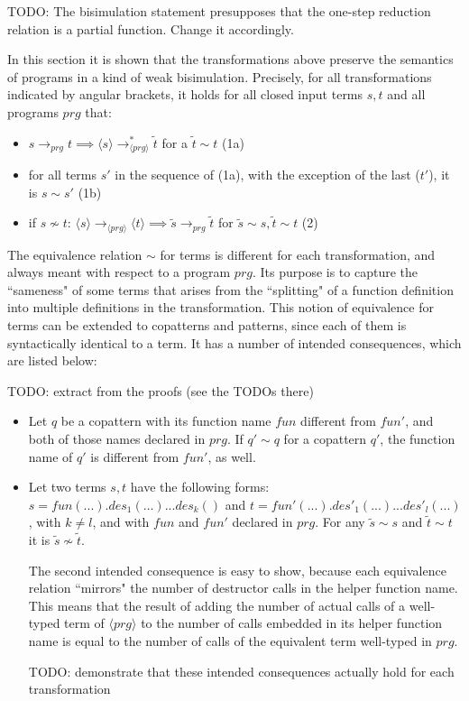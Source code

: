 \documentclass[11pt]{article} %
\begin{document}
TODO: The bisimulation statement presupposes that the one-step reduction relation is a partial function. Change it accordingly.

In this section it is shown that the transformations above preserve the semantics of programs in a kind of weak bisimulation. Precisely, for all transformations indicated by angular brackets, it holds for all closed input terms $s, t$ and all programs $prg$ that:

\begin{itemize}
\item $s \longrightarrow_{prg} t \implies \langle s \rangle  \longrightarrow^*_{\langle prg \rangle} \tilde{t}$ for a $\tilde{t} \sim t$ (1a)

\item for all terms $s'$ in the sequence of (1a), with the exception of the last ($t'$), it is $s \sim s'$ (1b)

\item if $s \not\sim t$: $\langle s \rangle \longrightarrow_{\langle prg \rangle} \langle t \rangle \implies \tilde{s} \longrightarrow_{prg} \tilde{t}$ for $\tilde{s} \sim s, \tilde{t} \sim t$ (2)

\end{itemize}

The equivalence relation $\sim$ for terms is different for each transformation, and always meant with respect to a program $prg$. Its purpose is to capture the ``sameness" of some terms that arises from the ``splitting" of a function definition into multiple definitions in the transformation. This notion of equivalence for terms can be extended to copatterns and patterns, since each of them is syntactically identical to a term. It has a number of intended consequences, which are listed below:

TODO: extract from the proofs (see the TODOs there)

\begin{itemize}

\item Let $q$ be a copattern with its function name $fun$ different from $fun'$, and both of those names declared in $prg$. If $q' \sim q$ for a copattern $q'$, the function name of $q'$ is different from $fun'$, as well.

\item Let two terms $s,t$ have the following forms: $s = fun(...).des_1(...)...des_k()$ and $t = fun'(...).des'_1(...)...des'_l(...)$, with $k \neq l$, and with $fun$ and $fun'$ declared in $prg$. For any $\widetilde{s} \sim s$ and $\widetilde{t} \sim t$ it is $\widetilde{s} \not\sim \widetilde{t}$.

The second intended consequence is easy to show, because each equivalence relation ``mirrors" the number of destructor calls in the helper function name. This means that the result of adding the number of actual calls of a well-typed term of $\langle prg \rangle$ to the number of calls embedded in its helper function name is equal to the number of calls of the equivalent term well-typed in $prg$.

TODO: demonstrate that these intended consequences actually hold for each transformation

\end{itemize}
\end{document}
